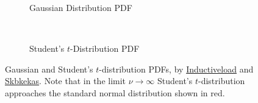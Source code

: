 \begin{figure}
  \centering

  \begin{subfigure}[b]{0.48\textwidth}\centering
  \caption{Gaussian Distribution PDF}
  \label{fig:dist:gaus}
  \end{subfigure}
  ~
  \begin{subfigure}[b]{\wd\largestimage}\centering
    \usebox{\largestimage}
  \caption{Student's $t$-Distribution PDF}
  \label{fig:dist:student_t}
  \end{subfigure}
\caption{
Gaussian and Student's $t$-distribution PDFs,
by \href{https://en.wikipedia.org/wiki/File:Normal_Distribution_PDF.svg}{Inductiveload}
and \href{https://en.wikipedia.org/wiki/File:Student_t_pdf.svg}{Skbkekas}.
Note that in the limit $\nu \to \infty$ Student's $t$-distribution
approaches the standard normal distribution shown in red.
\label{fig:dist:gaus_student_t}
}
\end{figure}

